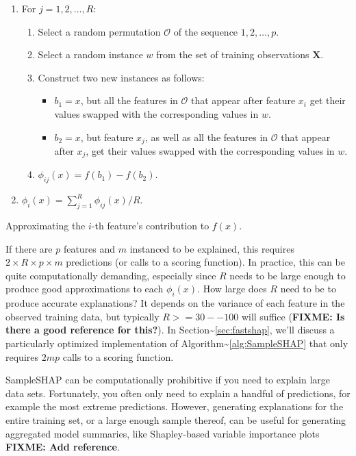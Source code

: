\begin{algorithm}
\begin{enumerate}
  \item For $j = 1, 2, \dots, R$:
  \begin{enumerate}
    \item Select a random permutation $\mathcal{O}$ of the sequence $1, 2, \dots, p$.
    \item Select a random instance $w$ from the set of training observations $\boldsymbol{X}$.
    \item Construct two new instances as follows:
    \begin{itemize}
      \item $b_1 = x$, but all the features in $\mathcal{O}$ that appear after feature $x_i$ get their values swapped with the corresponding values in $w$.
      \item $b_2 = x$, but feature $x_j$, as well as all the features in $\mathcal{O}$ that appear after $x_j$, get their values swapped with the corresponding values in $w$.
    \end{itemize}
    \item $\phi_{ij}\left(x\right) = f\left(b_1\right) - f\left(b_2\right)$.
  \end{enumerate}
  \item $\phi_i\left(x\right) = \sum_{j = 1} ^ R \phi_{ij}\left(x\right) / R$.
\end{enumerate}
\caption{Approximating the $i$-th feature's contribution to $f\left(x\right)$. \label{alg:SampleSHAP}}
\end{algorithm}

If there are \(p\) features and \(m\) instanced to be explained, this
requires \(2 \times R \times p \times m\) predictions (or calls to a
scoring function). In practice, this can be quite computationally
demanding, especially since \(R\) needs to be large enough to produce
good approximations to each \(\phi_i\left(x\right)\). How large does
\(R\) need to be to produce accurate explanations? It depends on the
variance of each feature in the observed training data, but typically
\(R >= 30--100\) will suffice (\textbf{FIXME: Is there a good reference
for this?}). In Section\textasciitilde{}\ref{sec:fastshap}, we'll
discuss a particularly optimized implementation of
Algorithm\textasciitilde{}\ref{alg:SampleSHAP} that only requires
\(2mp\) calls to a scoring function.

SampleSHAP can be computationally prohibitive if you need to explain
large data sets. Fortunately, you often only need to explain a handful
of predictions, for example the most extreme predictions. However,
generating explanations for the entire training set, or a large enough
sample thereof, can be useful for generating aggregated model summaries,
like Shapley-based variable importance plots \textbf{FIXME: Add
reference}.

